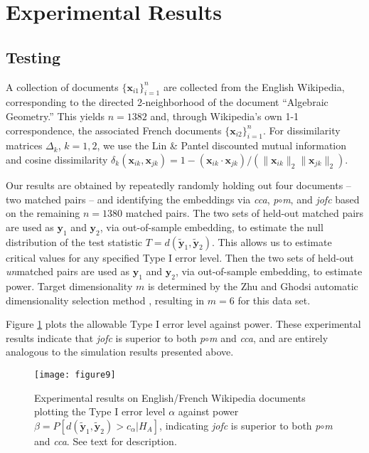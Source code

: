 \documentclass[12pt,xcolor]{article}
\newcommand{\1}{\ensuremath{\mbox{{\bf 1}}}}
\begin{document}
\section{Experimental Results}

\subsection{Testing}\label{section:testing}

A collection of documents $\{\bm{x}_{i1}\}_{i=1}^n$ are collected from the English Wikipedia,
corresponding to the directed 2-neighborhood of the document ``Algebraic Geometry.''
This yields $n=1382$ and, through Wikipedia's own 1-1 correspondence,
the associated French documents $\{\bm{x}_{i2}\}_{i=1}^n$.
For dissimilarity matrices $\Delta_k$, $k=1,2$, we use the Lin \& Pantel discounted mutual information \cite{LinPantel1,LinPantel2}
and cosine dissimilarity $\delta_k(\bm{x}_{ik},\bm{x}_{jk}) = 1-(\bm{x}_{ik} \cdot \bm{x}_{jk})/(\|\bm{x}_{ik}\|_2 \|\bm{x}_{jk}\|_2)$.

Our results are obtained by repeatedly randomly holding out four documents -- two matched pairs --
and identifying the embeddings via {\em cca}, {\it p}$\circ${\it m}, and {\em jofc}
based on the remaining $n=1380$ matched pairs.
The two sets of held-out matched pairs are used as $\bm{y}_{1}$ and $\bm{y}_{2}$,
via out-of-sample embedding, to estimate the null distribution of the
test statistic $T=d(\widetilde{\bm{y}}_1,\widetilde{\bm{y}}_2)$.
This allows us to estimate critical values for any specified Type I error level.
Then the two sets of held-out {\em un}matched pairs are used as $\bm{y}_{1}$ and $\bm{y}_{2}$,
via out-of-sample embedding, to estimate power.
Target dimensionality $m$
is determined by the Zhu and Ghodsi automatic dimensionality selection method \cite{ZhuGhodsi},
resulting in $m=6$ for this data set.

Figure \ref{fig:exproc} plots the allowable Type I error level against power.
These experimental results indicate that {\em jofc} is superior to both {\it p}$\circ${\it m} and {\em cca},
and are entirely analogous to the simulation results presented above.

\begin{figure}[h]
\begin{center}
\texttt{[image: figure9]}
\caption{
Experimental results on English/French Wikipedia documents
plotting the Type I error level $\alpha$ against power $\beta = P[d(\widetilde{\bm{y}}_1,\widetilde{\bm{y}}_2)>c_{\alpha} | H_A]$,
indicating {\em jofc} is superior to both {\it p}$\circ${\it m} and {\em cca}.
See text for description.
}\label{fig:exproc}
\end{center}
\end{figure}
\end{document}
